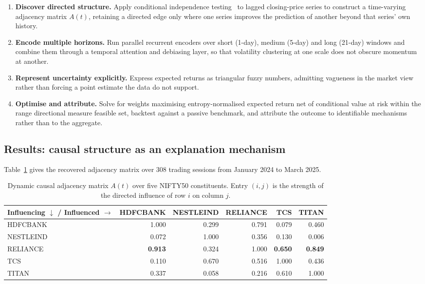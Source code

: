\begin{enumerate}[label=\textbf{Step \arabic*.},leftmargin=4.2em]
\item \textbf{Discover directed structure.} Apply conditional independence
testing~\cite{spirtes2000,granger1969} to lagged closing-price series to construct a
time-varying adjacency matrix $A(t)$, retaining a directed edge only where one series
improves the prediction of another beyond that series' own history.
\item \textbf{Encode multiple horizons.} Run parallel recurrent encoders over short
(1-day), medium (5-day) and long (21-day) windows and combine them through a temporal
attention and debiasing layer, so that volatility clustering at one scale does not obscure
momentum at another.
\item \textbf{Represent uncertainty explicitly.} Express expected returns as triangular
fuzzy numbers, admitting vagueness in the market view rather than forcing a point estimate
the data do not support.
\item \textbf{Optimise and attribute.} Solve for weights maximising entropy-normalised
expected return net of conditional value at risk within the range directional measure
feasible set, backtest against a passive benchmark, and attribute the outcome to
identifiable mechanisms rather than to the aggregate.
\end{enumerate}

\subsection{Results: causal structure as an explanation mechanism}

Table~\ref{tab:causal} gives the recovered adjacency matrix over 308 trading sessions from
January 2024 to March 2025.

\begin{table}[!htb]
\centering
\caption[Dynamic causal adjacency matrix]{Dynamic causal adjacency matrix $A(t)$ over five NIFTY50 constituents. Entry
$(i,j)$ is the strength of the directed influence of row $i$ on column $j$.}
\label{tab:causal}
\tabfont
\begin{tabular}{@{}lrrrrr@{}}
\toprule
\textbf{Influencing $\downarrow$ / Influenced $\rightarrow$} & \textbf{HDFCBANK} &
\textbf{NESTLEIND} & \textbf{RELIANCE} & \textbf{TCS} & \textbf{TITAN} \\
\midrule
HDFCBANK  & 1.000 & 0.299 & 0.791 & 0.079 & 0.460 \\
NESTLEIND & 0.072 & 1.000 & 0.356 & 0.130 & 0.006 \\
RELIANCE  & \textbf{0.913} & 0.324 & 1.000 & \textbf{0.650} & \textbf{0.849} \\
TCS       & 0.110 & 0.670 & 0.516 & 1.000 & 0.436 \\
TITAN     & 0.337 & 0.058 & 0.216 & 0.610 & 1.000 \\
\bottomrule
\end{tabular}
\end{table}

